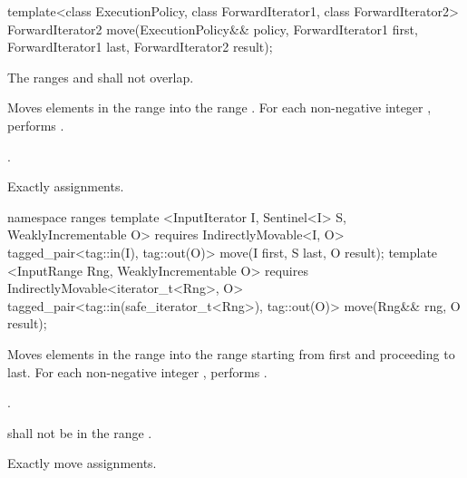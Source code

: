 %
\begin{itemdecl}
template<class ExecutionPolicy, class ForwardIterator1, class ForwardIterator2>
  ForwardIterator2 move(ExecutionPolicy&& policy,
                        ForwardIterator1 first, ForwardIterator1 last,
                        ForwardIterator2 result);
\end{itemdecl}

\begin{itemdescr}
\pnum
\requires The ranges  and
 shall not overlap.

\pnum
\effects Moves elements in the range  into
the range .
For each non-negative integer ,
performs .

\pnum
\returns {}.

\pnum
\complexity Exactly  assignments.
\end{itemdescr}

\begin{addedblock}
%
\begin{itemdecl}
namespace ranges {
  template <InputIterator I, Sentinel<I> S, WeaklyIncrementable O>
      requires IndirectlyMovable<I, O>
    tagged_pair<tag::in(I), tag::out(O)> move(I first, S last, O result);
  template <InputRange Rng, WeaklyIncrementable O>
      requires IndirectlyMovable<iterator_t<Rng>, O>
    tagged_pair<tag::in(safe_iterator_t<Rng>), tag::out(O)> move(Rng&& rng, O result);
}
\end{itemdecl}

\begin{itemdescr}
\pnum
\effects
Moves elements in the range 
into the range 
starting from first and proceeding to last.
For each non-negative integer
,
performs
.

\pnum
\returns
{}.

\pnum
\requires
{}
shall not be in the range
.

\pnum
\complexity
Exactly
move assignments.
\end{itemdescr}
\end{addedblock}

